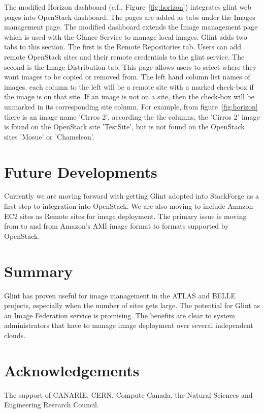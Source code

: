 \documentclass[a4paper]{jpconf}
\begin{document}
The modified Horizon dashboard (c.f., Figure~\ref{fig:horizon}) integrates glint web pages into OpenStack dashboard. The pages are added as tabs under the Images management page. The modified dashboard extends the Image management page which is used with the Glance Service to manage local images. Glint adds two tabs to this section. The first is the Remote Repositories tab. Users can add remote OpenStack sites and their remote credentials to the glint service. The second is the Image Distribution tab. This page allows users to select where they want images to be copied or removed from. The left hand column list names of images, each column to the left will be a remote site with a marked check-box if the image is on that site. If an image is not on a site, then the check-box will be unmarked in its corresponding site column. For example, from figure~\ref{fig:horizon} there is an image name 'Cirros 2', according the the columns, the 'Cirros 2' image is found on the OpenStack site 'TestSite', but is not found on the OpenStack sites 'Mosue' or 'Chameleon'. 

\section{Future Developments}
Currently we are moving forward with getting Glint adopted into StackForge as a first step to integration into OpenStack. We are also moving to include Amazon EC2 sites as Remote sites for image deployment. The primary issue is moving from to and from Amazon's AMI image format to formats supported by OpenStack. 

\section{Summary}
Glint has proven useful for image management in the ATLAS and BELLE projects, especially when the number of sites gets large. The potential for Glint as an Image Federation service is promising. The benefits are clear to system administrators that have to manage image deployment over several independent clouds. 

\section*{Acknowledgements}
The support of CANARIE, CERN, Compute Canada, the Natural Sciences and Engineering Research Council.
\end{document}
